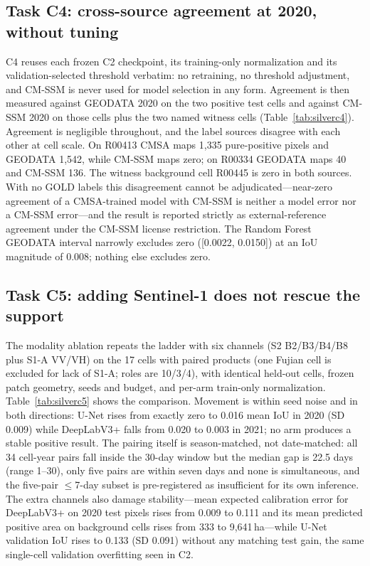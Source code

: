 \subsection{Task C4: cross-source agreement at 2020, without tuning}
C4 reuses each frozen C2 checkpoint, its training-only normalization
and its validation-selected threshold verbatim: no retraining, no
threshold adjustment, and CM-SSM is never used for model selection in
any form. Agreement is then measured against GEODATA 2020 on the two
positive test cells and against CM-SSM 2020 on those cells plus the two
named witness cells (Table~\ref{tab:silverc4}). Agreement is negligible
throughout, and the label sources disagree with each other at cell
scale. On R00413 CMSA maps 1{,}335 pure-positive pixels and GEODATA
1{,}542, while CM-SSM maps zero; on R00334 GEODATA maps 40 and CM-SSM
136. The witness background cell R00445 is zero in both sources. With
no GOLD labels this disagreement cannot be adjudicated---near-zero
agreement of a CMSA-trained model with CM-SSM is neither a model error
nor a CM-SSM error---and the result is reported strictly as
external-reference agreement under the CM-SSM license restriction. The
Random Forest GEODATA interval narrowly excludes zero
([0.0022, 0.0150]) at an IoU magnitude of 0.008; nothing else excludes
zero.



\subsection{Task C5: adding Sentinel-1 does not rescue the support}
The modality ablation repeats the ladder with six channels
(S2 B2/B3/B4/B8 plus S1-A VV/VH) on the 17 cells with paired products
(one Fujian cell is excluded for lack of S1-A; roles are 10/3/4), with
identical held-out cells, frozen patch geometry, seeds and budget, and
per-arm train-only normalization. Table~\ref{tab:silverc5} shows the
comparison. Movement is within seed noise and in both directions: U-Net
rises from exactly zero to 0.016 mean IoU in 2020 (SD 0.009) while
DeepLabV3+ falls from 0.020 to 0.003 in 2021; no arm produces a stable
positive result. The pairing itself is season-matched, not
date-matched: all 34 cell-year pairs fall inside the 30-day window but
the median gap is 22.5 days (range 1--30), only five pairs are within
seven days and none is simultaneous, and the five-pair $\leq$7-day
subset is pre-registered as insufficient for its own inference. The
extra channels also damage stability---mean expected calibration error
for DeepLabV3+ on 2020 test pixels rises from 0.009 to 0.111 and its
mean predicted positive area on background cells rises from 333 to
9{,}641\,ha---while U-Net validation IoU rises to 0.133 (SD 0.091)
without any matching test gain, the same single-cell validation
overfitting seen in C2.

